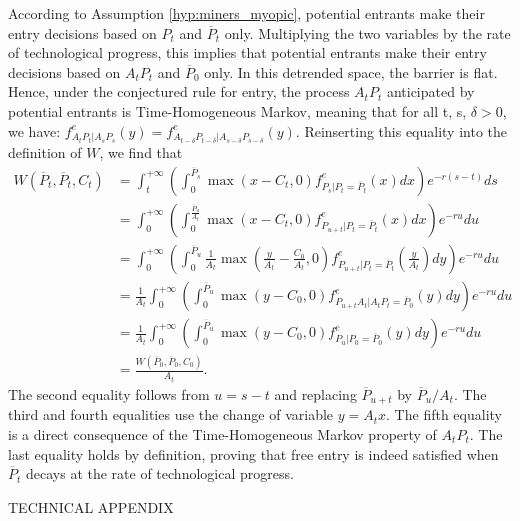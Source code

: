 \documentclass[12pt, a4paper]{article}
\begin{document}
According to Assumption \ref{hyp:miners_myopic}, potential entrants make
their entry decisions based on $P_t$ and $\overline{P}_t$ only. Multiplying
the two variables by the rate of technological progress, this implies
that potential entrants make their entry decisions based on $A_tP_t$ and $%
\overline{P}_0$ only. In this detrended space, the barrier is flat. Hence,
under the conjectured rule for entry, the process $A_tP_t$ anticipated by
potential entrants is Time-Homogeneous Markov, meaning that for all t, s, $\delta >0$, we have: $%
f_{A_tP_t|A_sP_s}^e(y)=f_{A_{t-\delta}P_{t-\delta}|A_{s-\delta}P_{s-\delta}}^e(y)$. Reinserting
this equality into the definition of $W$, we find that
\begin{align*}
W\left(\overline{P}_t,\overline{P}_t,C_t\right)&=\int_{t}^{+\infty}\left(%
\int_0^{\overline{P}_s}\max\left(x-C_t,0\right)f_{P_s|P_t=\overline{P}%
_t}^e(x)dx\right)e^{-r(s-t)}ds &  \\
&=\int_{0}^{+\infty}\left(\int_0^{\frac{\overline{P}_u}{A_t}%
}\max\left(x-C_t,0\right)f_{P_{u+t}|P_t=\overline{P}_t}^e(x)dx%
\right)e^{-ru}du &  \\
&=\int_{0}^{+\infty}\left(\int_0^{\overline{P}_u}\frac{1}{A_t}\max\left(%
\frac{y}{A_t}-\frac{C_0}{A_t},0\right)f_{P_{u+t}|P_t=\overline{P}_t}^e\left(%
\frac{y}{A_t}\right)dy\right)e^{-ru}du &  \\
&=\frac{1}{A_t}\int_{0}^{+\infty}\left(\int_0^{\overline{P}%
_u}\max\left(y-C_0,0\right)f_{P_{u+t}A_t|A_tP_t=\overline{P}%
_0}^e\left(y\right)dy\right)e^{-ru}du &  \\
&=\frac{1}{A_t}\int_{0}^{+\infty}\left(\int_0^{\overline{P}%
_u}\max\left(y-C_0,0\right)f_{P_u|P_0=\overline{P}_0}^e\left(y\right)dy%
\right)e^{-ru}du &  \\
&=\frac{W\left(\overline{P}_0,\overline{P}_0,C_0\right)}{A_t}. &
\end{align*}
The second equality follows from $u = s-t$ and replacing $\overline{P}_{u+t}$
by $\overline{P}_u/A_t$. The third and fourth equalities use the change of
variable $y=A_tx$. The fifth equality is a direct consequence of the
Time-Homogeneous Markov property of $A_tP_t$. The last equality holds by
definition, proving that free entry is indeed satisfied when $\overline{P}%
_t$ decays at the rate of technological progress.


\newpage



\appendix
\begin{center}
\Large{\textsc{TECHNICAL APPENDIX}}
\end{center}
\end{document}
